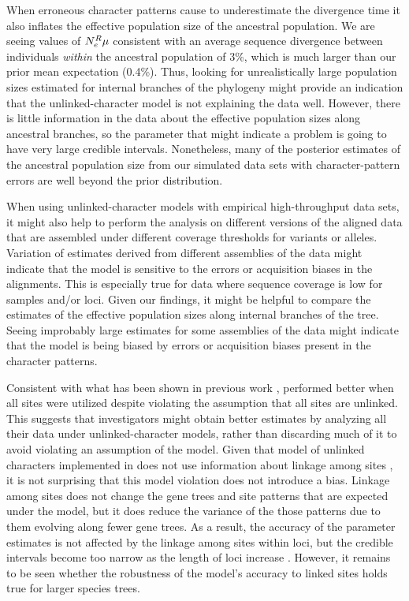 When erroneous character patterns cause \ecoevolity to underestimate the
divergence time it also inflates the effective population size of the ancestral
population.
We are seeing values of $N_{e}^{R{}}\mu$ consistent with an average sequence
divergence between individuals \emph{within} the ancestral population of 3\%,
which is much larger than our prior mean expectation (0.4\%).
Thus, looking for unrealistically large population sizes estimated for internal
branches of the phylogeny might provide an indication that the
unlinked-character model is not explaining the data well.
However, there is little information in the data about the effective population
sizes along ancestral branches,
so the parameter that might indicate a problem is going to have very
large credible intervals.
Nonetheless, many of the posterior estimates of the ancestral population size
from our simulated data sets with character-pattern errors are well beyond the
prior distribution.

When using unlinked-character models with empirical high-throughput data sets,
it might also help to perform the analysis on different versions of the aligned
data that are assembled under different coverage thresholds for variants or
alleles.
Variation of estimates derived from different assemblies of the data might
indicate that the model is sensitive to the errors or acquisition biases in the
alignments.
This is especially true for data where sequence coverage is low for samples
and/or loci.
Given our findings, it might be helpful to compare the estimates of the
effective population sizes along internal branches of the tree.
Seeing improbably large estimates for some assemblies of the
data might indicate that the model is being biased by
errors or acquisition biases present in the character patterns.

Consistent with what has been shown in previous work
\citep{Oaks2018ecoevolity,Oaks2018paic},
\ecoevolity performed better when all sites were utilized despite violating the
assumption that all sites are unlinked.
This suggests that investigators might obtain better estimates by analyzing all
their data under unlinked-character models, rather than discarding much of it
to avoid violating an assumption of the model.
Given that model of unlinked characters implemented in \ecoevolity
does not use information about linkage among sites 
\citep{bryantInferringSpeciesTrees2012, Oaks2018ecoevolity},
it is not surprising that this model violation does not introduce a bias.
Linkage among sites does not change the gene trees and site patterns that are
expected under the model, but it does reduce the variance of the those patterns
due to them evolving along fewer gene trees.
As a result, the accuracy of the parameter estimates is not affected
by the linkage among sites within loci, but the credible intervals
become too narrow as the length of loci increase
\citep{Oaks2018ecoevolity,Oaks2018paic}.
However, it remains to be seen whether the robustness of the model's accuracy
to linked sites holds true for larger species trees.


